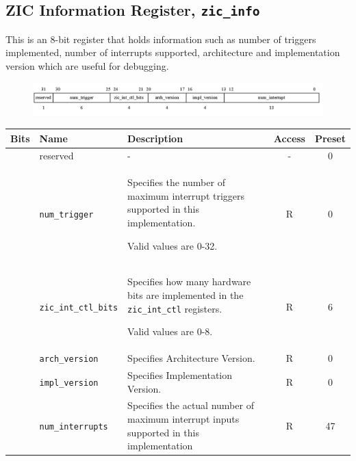 \subsection{ZIC Information Register, \texttt{zic\_info}}
\label{subsec:zic-info}

This is an 8-bit register that holds information such as number of triggers implemented, number of interrupts supported, architecture and implementation version which are useful for debugging.

\vspace{0.5cm}
\begin{figure}[H]
    \centering
    \includegraphics[width = 15.25cm]{images/zic_info.png}
    \label{fig:zic_cfg}
\end{figure}
\vspace{0.25cm}

\vspace{0.5cm}
\begin{table}[H]
    \label{tab:zic_info}
        \centering
        \begin{tabular}{l l p{6cm} c c}
         \hline 
         \textbf{Bits} & \textbf{Name} & \textbf{Description} & \textbf{Access} & \textbf{Preset}\\ \hline \hline
         [31] & reserved & - & - & 0 \\ \hline
         [30:25] & \texttt{num\_trigger} & Specifies the number of maximum interrupt triggers supported in this implementation.
         
         Valid values are 0-32. & R & 0\\ \hline
         [24:21] & \texttt{zic\_int\_ctl\_bits\footnotemark} & Specifies how many hardware bits are implemented in the \texttt{zic\_int\_ctl} registers. 

         Valid values are 0-8. & R & 6\\ \hline
         [20:17] & \texttt{arch\_version} & Specifies Architecture Version. & R & 0\\ \hline
         [16:13] & \texttt{impl\_version} & Specifies Implementation Version. & R & 0 \\ \hline
         [12:10] & \texttt{num\_interrupts} & Specifies the actual number of maximum interrupt inputs supported in this implementation & R & 47 \\ \hline
         \end{tabular}
\end{table}

